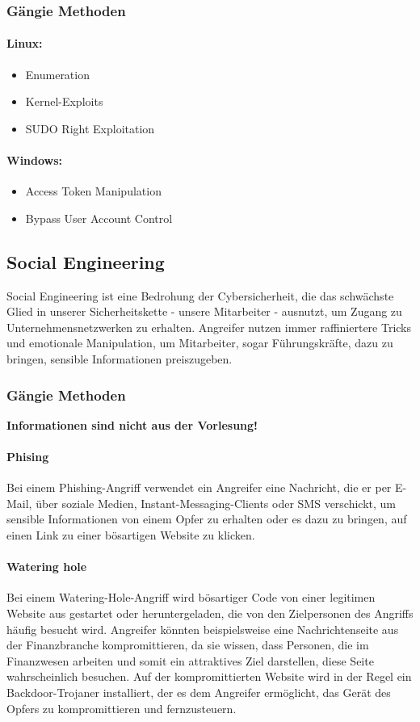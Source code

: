 \subsubsection{Gängie Methoden}
\paragraph{Linux:}
\begin{itemize}
  \item Enumeration
  \item Kernel-Exploits
  \item SUDO Right Exploitation
\end{itemize}
\paragraph{Windows:}
\begin{itemize}
  \item Access Token Manipulation
  \item Bypass User Account Control
\end{itemize}

\subsection{Social Engineering}
Social Engineering ist eine Bedrohung der Cybersicherheit, die das schwächste Glied in unserer Sicherheitskette - unsere Mitarbeiter - ausnutzt, um Zugang zu Unternehmensnetzwerken zu erhalten. 
Angreifer nutzen immer raffiniertere Tricks und emotionale Manipulation, um Mitarbeiter, sogar Führungskräfte, dazu zu bringen, sensible Informationen preiszugeben.

\subsubsection{Gängie Methoden}
\textbf{Informationen sind nicht aus der Vorlesung!}
\paragraph{Phising}
Bei einem Phishing-Angriff verwendet ein Angreifer eine Nachricht, die er per E-Mail, über soziale Medien, Instant-Messaging-Clients oder SMS verschickt, um sensible Informationen von einem Opfer zu erhalten oder es dazu zu bringen, auf einen Link zu einer bösartigen Website zu klicken.

\paragraph{Watering hole}
Bei einem Watering-Hole-Angriff wird bösartiger Code von einer legitimen Website aus gestartet oder heruntergeladen, die von den Zielpersonen des Angriffs häufig besucht wird. Angreifer könnten beispielsweise eine Nachrichtenseite aus der Finanzbranche kompromittieren, da sie wissen, dass Personen, die im Finanzwesen arbeiten und somit ein attraktives Ziel darstellen, diese Seite wahrscheinlich besuchen. Auf der kompromittierten Website wird in der Regel ein Backdoor-Trojaner installiert, der es dem Angreifer ermöglicht, das Gerät des Opfers zu kompromittieren und fernzusteuern.

